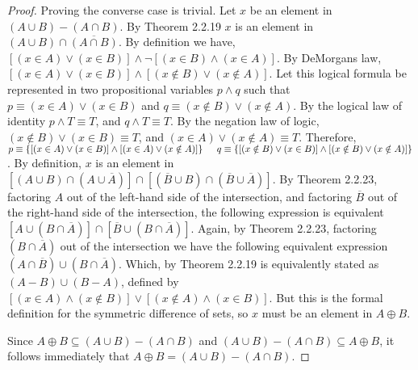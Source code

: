 \documentclass[a4paper, 12pt]{article}
\theoremstyle{plain}
\begin{document}
\begin{proof}
		Proving the converse case is trivial. Let $x$ be an element in \newline 
		$(A \cup B) - (A \cap B)$. By Theorem 2.2.19 $x$ is an element in 
		$(A \cup B) \cap \overline{(A \cap B)}$. By definition we have, 
		$[(x \in A) \lor (x \in B)] \land \lnot [(x \in B) \land (x \in A)]$. By DeMorgans law, 
		$[(x \in A) \lor (x \in B)] \land [(x \notin B) \lor (x \notin A)]$. Let this logical formula 
		be represented in two propositional variables $p \land q$ such that 
		$p \equiv (x \in A) \lor (x \in B)$ and $q \equiv (x \notin B) \lor (x \notin A)$. By the 
		logical law of identity $p \land T \equiv T$, and $q \land T \equiv T$. By the negation law 
		of logic, $(x \notin B) \lor (x \in B) \equiv T$, and $(x \in A) \lor (x \notin A) \equiv T$. 
		Therefore, \newline \indent 
		$p \equiv \{[(x \in A) \lor (x \in B)] \land [(x \in A) \lor (x \notin A)]\} 
		\newline \indent q \equiv \{[(x \notin B) \lor (x \in B)] \land 
		[(x \notin B) \lor (x \notin A)]\}$. 
		\newline By definition, $x$ is an element in 
		$[(A \cup B) \cap (A \cup \overline{A})] \cap 
		[(\overline{B} \cup B) \cap (\overline{B} \cup \overline{A})]$. By Theorem 2.2.23, 
		factoring $A$ out of the left-hand side of the intersection, and factoring $\overline{B}$ 
		out of the right-hand side of the intersection, the following expression is equivalent 
		$[A \cup (B \cap \overline{A})] \cap [\overline{B} \cup (B \cap \overline{A})]$. Again, by 
		Theorem 2.2.23, factoring $(B \cap \overline{A})$ out of the intersection we have the following 
		equivalent expression $(A \cap \overline{B}) \cup (B \cap \overline{A})$. Which, by 
		Theorem 2.2.19 is equivalently stated as $(A - B) \cup (B - A)$, defined by 
		$[(x \in A) \land (x \notin B)] \lor [(x \notin A) \land (x \in B)]$. But this is the formal 
		definition for the symmetric difference of sets, so $x$ must be an element in $A \oplus B$.
		
		Since $A \oplus B \subseteq (A \cup B) - (A \cap B)$ and 
		$(A \cup B) - (A \cap B) \subseteq A \oplus B$, it follows immediately that 
		$A \oplus B = (A \cup B) - (A \cap B)$.
	\end{proof}
\end{document}
